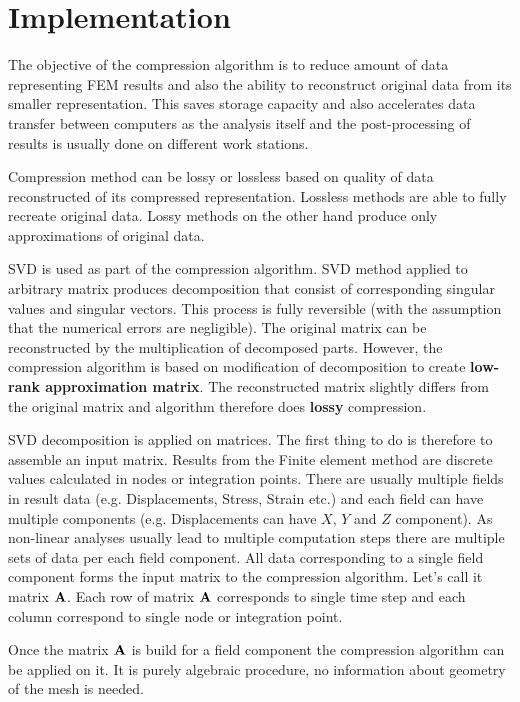 \section{Implementation}
\label{sec:implementation}

The objective of the compression algorithm is to reduce amount of data representing FEM results and also the ability to reconstruct original data from its smaller representation. This saves storage capacity and also accelerates data transfer between computers as the analysis itself and the post-processing of results is usually done on different work stations.

Compression method can be lossy or lossless based on quality of data reconstructed of its compressed representation. Lossless methods are able to fully recreate original data. Lossy methods on the other hand produce only approximations of original data. 

SVD is used as part of the compression algorithm. SVD method applied to arbitrary matrix produces decomposition that consist of corresponding singular values and singular vectors. This process is fully reversible (with the assumption that the numerical errors are negligible). The original matrix can be reconstructed by the multiplication of decomposed parts. However, the compression algorithm is based on modification of decomposition to create \textbf{low-rank approximation matrix}. The reconstructed matrix slightly differs from the original matrix and algorithm therefore does \textbf{lossy} compression.

SVD decomposition is applied on matrices. The first thing to do is therefore to assemble an input matrix. Results from the Finite element method are discrete values calculated in nodes or integration points. There are usually multiple fields in result data (e.g. Displacements, Stress, Strain etc.) and each field can have multiple components (e.g. Displacements can have $X$, $Y$ and $Z$ component). As non-linear analyses usually lead to multiple computation steps there are multiple sets of data per each field component. All data corresponding to a single field component forms the input matrix to the compression algorithm. Let's call it matrix $\mathbf{A}$. Each row of matrix $\mathbf{A}$ corresponds to single time step and each column correspond to single node or integration point.

Once the matrix $\mathbf{A}$ is build for a field component the compression algorithm can be applied on it. It is purely algebraic procedure, no information about geometry of the mesh is needed.

